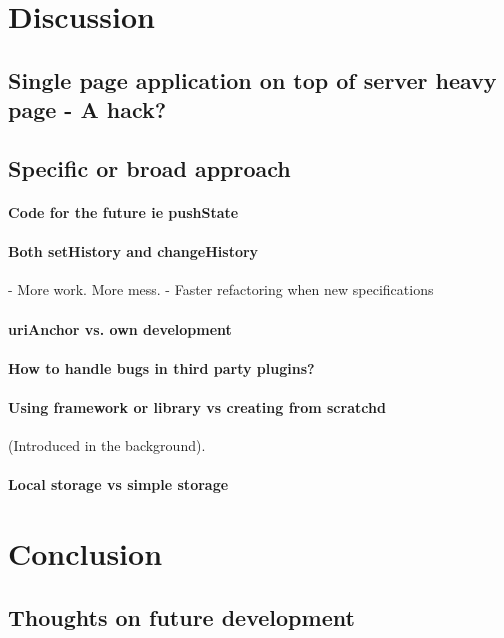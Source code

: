 \documentclass[english]{ifimaster}
\begin{document}

\chapter{Discussion}
\section{Single page application on top of server heavy page - A hack?}
\section{Specific or broad approach}
\subsubsection{Code for the future ie pushState} {}
\subsubsection{Both setHistory and changeHistory} {}
 - More work. More mess.
 - Faster refactoring when new specifications
\subsubsection{uriAnchor vs. own development} 
\subsubsection{How to handle bugs in third party plugins?} 
\subsubsection{Using framework or library vs creating from scratchd}  (Introduced in the background).
\subsubsection{Local storage vs simple storage} 


\chapter{Conclusion}

\section{Thoughts on future development}
\end{document}
